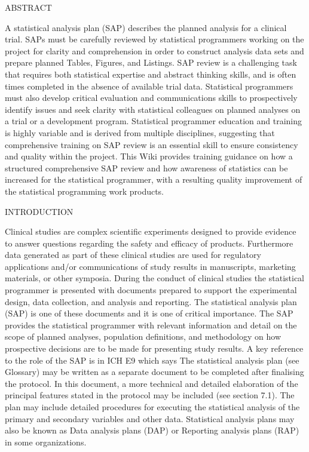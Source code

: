 ABSTRACT

A statistical analysis plan (SAP) describes the planned analysis for a clinical trial. SAPs must be carefully reviewed by statistical programmers working on the project for clarity and comprehension in order to construct analysis data sets and prepare planned Tables, Figures, and Listings. SAP review is a challenging task that requires both statistical expertise and abstract thinking skills, and is often times completed in the absence of available trial data. Statistical programmers must also develop critical evaluation and communications skills to prospectively identify issues and seek clarity with statistical colleagues on planned analyses on a trial or a development program. Statistical programmer education and training is highly variable and is derived from multiple disciplines, suggesting that comprehensive training on SAP review is an essential skill to ensure consistency and quality within the project. This Wiki provides training guidance on how a structured comprehensive SAP review and how awareness of statistics can be increased for the statistical programmer, with a resulting quality improvement of the statistical programming work products.

INTRODUCTION

Clinical studies are complex scientific experiments designed to provide evidence to answer questions regarding the safety and efficacy of products. Furthermore data generated as part of these clinical studies are used for regulatory applications and/or communications of study results in manuscripts, marketing materials, or other symposia. During the conduct of clinical studies the statistical programmer is presented with documents prepared to support the experimental design, data collection, and analysis and reporting. The statistical analysis plan (SAP) is one of these documents and it is one of critical importance. The SAP provides the statistical programmer with relevant information and detail on the scope of planned analyses, population definitions, and methodology on how prospective decisions are to be made for presenting study results. A key reference to the role of the SAP is in ICH E9 which says
The statistical analysis plan (see Glossary) may be written as a separate document to be completed after finalising the protocol. In this document, a more technical and detailed elaboration of the principal features stated in the protocol may be included (see section 7.1). The plan may include detailed procedures for executing the statistical analysis of the primary and secondary variables and other data.
Statistical analysis plans may also be known as Data analysis plans (DAP) or Reporting analysis plans (RAP) in some organizations.

